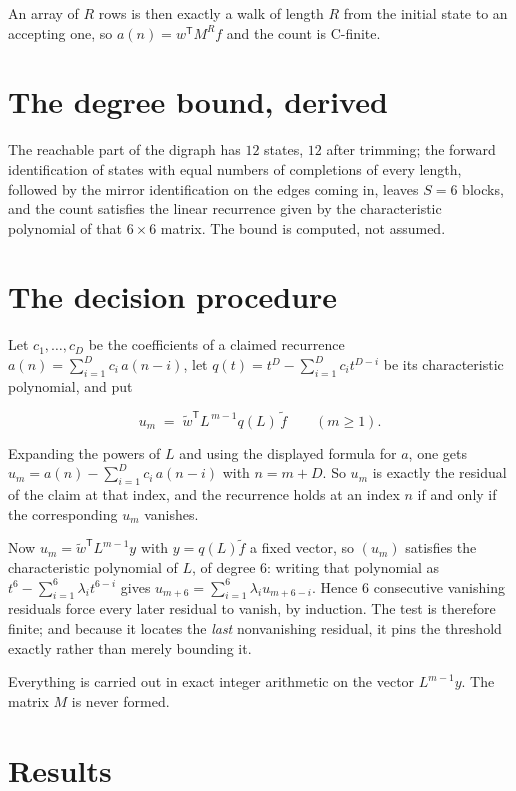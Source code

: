 \documentclass[11pt]{article}
\theoremstyle{definition}
\begin{document}
An array of $R$ rows is then exactly a walk of length $R$ from the initial state to an accepting one, so $a(n) = w^{\mathsf T}M^{R}f$ and the count is C-finite.

\section{The degree bound, derived}

The reachable part of the digraph has $12$ states, $12$ after trimming; the forward identification of states with equal numbers of completions of every length, followed by the mirror identification on the edges coming in, leaves $S = 6$ blocks, and the count satisfies the linear recurrence given by the characteristic polynomial of that $6\times6$ matrix. The bound is computed, not assumed.

\section{The decision procedure}

Let $c_1,\dots,c_D$ be the coefficients of a claimed recurrence $a(n) = \sum_{i=1}^{D} c_i\,a(n-i)$, let $q(t) = t^{D} - \sum_{i=1}^{D} c_i t^{D-i}$ be its characteristic polynomial, and put

\[u_m \;=\; \tilde w^{\mathsf T} L^{\,m-1} q(L)\,\tilde f \qquad (m \ge 1).\]

Expanding the powers of $L$ and using the displayed formula for $a$, one gets $u_m = a(n) - \sum_{i=1}^{D} c_i\,a(n-i)$ with $n = m + D$. So $u_m$ is exactly the residual of the claim at that index, and the recurrence holds at an index $n$ if and only if the corresponding $u_m$ vanishes.

Now $u_m = \tilde w^{\mathsf T} L^{m-1} y$ with $y = q(L)\tilde f$ a fixed vector, so $(u_m)$ satisfies the characteristic polynomial of $L$, of degree $6$: writing that polynomial as $t^{6} - \sum_{i=1}^{6} \lambda_i t^{6-i}$ gives $u_{m+6} = \sum_{i=1}^{6} \lambda_i u_{m+6-i}$. Hence $6$ consecutive vanishing residuals force every later residual to vanish, by induction. The test is therefore finite; and because it locates the {\itshape last} nonvanishing residual, it pins the threshold exactly rather than merely bounding it.

Everything is carried out in exact integer arithmetic on the vector $L^{m-1}y$. The matrix $M$ is never formed.

\section{Results}
\end{document}
